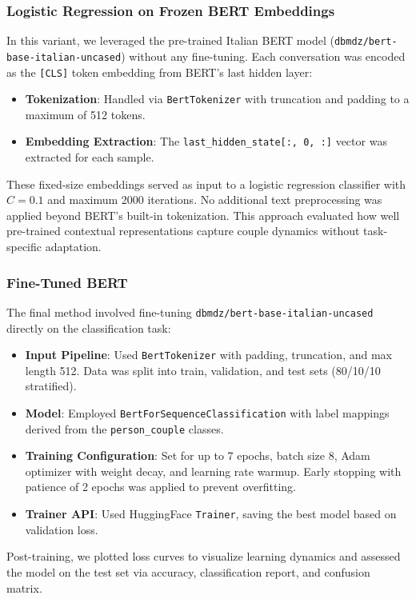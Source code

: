 \documentclass[conference]{IEEEtran}
\begin{document}
\subsubsection{Logistic Regression on Frozen BERT Embeddings}

In this variant, we leveraged the pre-trained Italian BERT model (\texttt{dbmdz/bert-base-italian-uncased}) without any fine-tuning. Each conversation was encoded as the \texttt{[CLS]} token embedding from BERT's last hidden layer:
\begin{itemize}
    \item \textbf{Tokenization}: Handled via \texttt{BertTokenizer} with truncation and padding to a maximum of 512 tokens.
    \item \textbf{Embedding Extraction}: The \texttt{last\_hidden\_state[:, 0, :]} vector was extracted for each sample.
\end{itemize}
These fixed-size embeddings served as input to a logistic regression classifier with \(C=0.1\) and maximum 2000 iterations. No additional text preprocessing was applied beyond BERT's built-in tokenization. This approach evaluated how well pre-trained contextual representations capture couple dynamics without task-specific adaptation.

\subsubsection{Fine-Tuned BERT}

The final method involved fine-tuning \texttt{dbmdz/bert-base-italian-uncased} directly on the classification task:
\begin{itemize}
    \item \textbf{Input Pipeline}: Used \texttt{BertTokenizer} with padding, truncation, and max length 512. Data was split into train, validation, and test sets (80/10/10 stratified).
    \item \textbf{Model}: Employed \texttt{BertForSequenceClassification} with label mappings derived from the \texttt{person\_couple} classes.
    \item \textbf{Training Configuration}: Set for up to 7 epochs, batch size 8, Adam optimizer with weight decay, and learning rate warmup. Early stopping with patience of 2 epochs was applied to prevent overfitting.
    \item \textbf{Trainer API}: Used HuggingFace \texttt{Trainer}, saving the best model based on validation loss.
\end{itemize}
Post-training, we plotted loss curves to visualize learning dynamics and assessed the model on the test set via accuracy, classification report, and confusion matrix.
\end{document}
